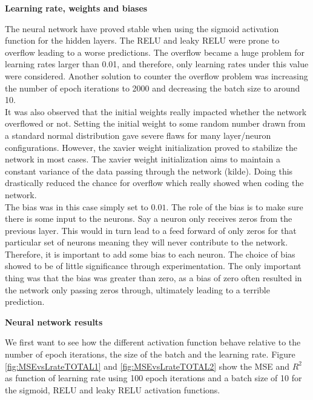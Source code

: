 \documentclass[12pt,a4paper]{article}
\begin{document}
\begin{center}
\large{\textbf{Learning rate, weights and biases}}
\end{center}

\noindent The neural network have proved stable when using the sigmoid activation function for the hidden layers. The RELU and leaky RELU were prone to overflow leading to a worse predictions. The overflow became a huge problem for learning rates larger than 0.01, and therefore, only learning rates under this value were considered. Another solution to counter the overflow problem was increasing the number of epoch iterations to 2000 and decreasing the batch size to around 10. 
\\
It was also observed that the initial weights really impacted whether the network overflowed or not. Setting the initial weight to some random number drawn from a standard normal distribution gave severe flaws for many layer/neuron configurations. However, the xavier weight initialization proved to stabilize the network in most cases. The xavier weight initialization aims to maintain a constant variance of the data passing through the network (kilde). Doing this drastically reduced the chance for overflow which really showed when coding the network.
\\
The bias was in this case simply set to $0.01$. The role of the bias is to make sure there is some input to the neurons. Say a neuron only receives zeros from the previous layer. This would in turn lead to a feed forward of only zeros for that particular set of neurons meaning they will never contribute to the network. Therefore, it is important to add some bias to each neuron. The choice of bias showed to be of little significance through experimentation. The only important thing was that the bias was greater than zero, as a bias of zero often resulted in the network only passing zeros through, ultimately leading to a terrible prediction.

\begin{center}
\large{\textbf{Neural network results}}
\end{center}

\noindent We first want to see how the different activation function behave relative to the number of epoch iterations, the size of the batch and the learning rate. Figure \ref{fig:MSEvsLrateTOTAL1} and \ref{fig:MSEvsLrateTOTAL2} show the MSE and $R^2$ as function of learning rate using 100 epoch iterations and a batch size of 10 for the sigmoid, RELU and leaky RELU activation functions.
\end{document}
